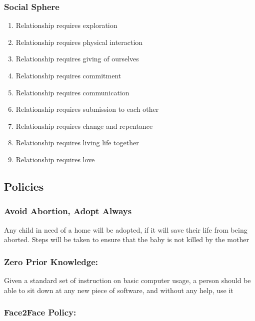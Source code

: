 \documentclass[CSHFoundation.tex]{subfiles}
\begin{document}
\subsubsection{Social Sphere}



\begin{enumerate}
\item Relationship requires exploration
\item Relationship requires physical interaction
\item Relationship requires giving of ourselves
\item Relationship requires commitment
\item Relationship requires communication
\item Relationship requires submission to each other
\item Relationship requires change and repentance
\item Relationship requires living life together
\item Relationship requires love
\end{enumerate}

\subsection{Policies}

\subsubsection{Avoid Abortion, Adopt Always}

Any child in need of a home will be adopted, if it will save their life from being aborted. Steps will be taken to ensure that the baby is not killed by the mother



\subsubsection{Zero Prior Knowledge:}

Given a standard set of instruction on basic computer usage, a person should be able to sit down at any new piece of software, and without any help, use it



\subsubsection{Face2Face Policy:}
\end{document}
